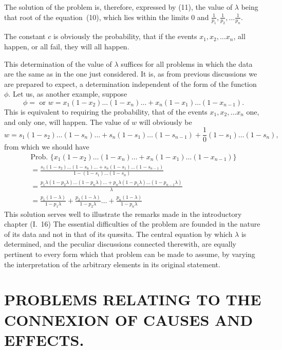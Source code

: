 \documentclass[oneside]{book}
\begin{document}
The solution of the problem is, therefore, expressed by (11),
the value of $\lambda$ being that root of the equation~(10), which lies
within the limits 0 and
$\frac{1}{p_1}, \frac{1}{p_2}, \dotsc \frac{1}{p_n}$.

The constant $c$ is obviously the probability, that if the events
$x_1, x_2, \dotsc x_n$, all happen, or all fail, they will all happen.

This determination of the value of $\lambda$ suffices for all problems
in which the data are the same as in the one just considered. It
is, as from previous discussions we are prepared to expect, a determination independent of the form of the function $\phi$.
Let us, as another example, suppose
\[
  \phi = \text{ or }
  w = x_1(1-x_2) \dotsc (1-x_n) \dotsc
    + x_n(1-x_1) \dotsc (1-x_{n-1}).
\]
This is equivalent to requiring the probability, that of the events
$x_1, x_2, \dotsc x_n$ one, and only one, will happen. The value of $w$ will
obviously be
\[
  w = s_1(1-s_2) \dotsc (1-s_n) \dotsc
    + s_n(1-s_1) \dotsc (1-s_{n-1})
    + \frac{1}{0}(1-s_1) \dotsc (1-s_n),
\]
from which we should have
\begin{gather*}
  \text{Prob. }
    \{ x_1(1-x_2) \dotsc (1-x_n) \dotsc
     + x_n(1-x_1) \dotsc (1-x_{n-1}) \}   \\
  = \frac{s_1(1-s_2) \dotsc (1-s_n) \dotsc
        + s_n(1-s_1) \dotsc (1-s_{n-1})}
         {1 - (1-s_1) \dotsc (1-s_n)}  \\
  = \frac{p_1\lambda(1-p_2\lambda) \dotsc (1-p_n\lambda) \dotsc
        + p_n\lambda(1-p_1\lambda) \dotsc (1-p_{n-1}\lambda)}
         {\lambda}  \\
  = \frac{p_1(1-\lambda)}{1-p_1\lambda}
  + \frac{p_2(1-\lambda)}{1-p_2\lambda} \dotsc
  + \frac{p_n(1-\lambda)}{1-p_n\lambda}
\end{gather*}
This solution serves well to illustrate the remarks made in the
introductory chapter (I.~16) The essential difficulties of the
problem are founded in the nature of its data and not in that of
its qu{\ae}sita. The central equation by which $\lambda$ is determined, and
the peculiar discussions connected therewith, are equally pertinent to every form which that problem can be made to assume,
by varying the interpretation of the arbitrary elements in its
original statement.

\chapter[PROBLEMS ON CAUSES]{\large PROBLEMS RELATING TO THE CONNEXION OF CAUSES AND
EFFECTS.}
\end{document}
